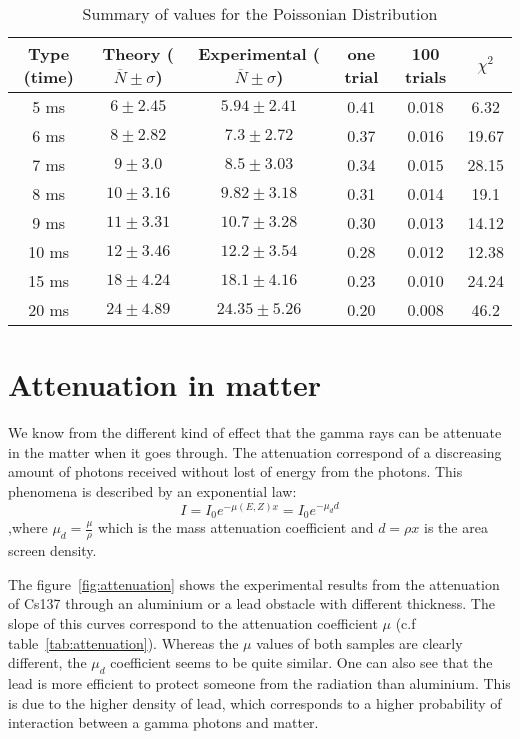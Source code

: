 \documentclass[a4paper,12pt,oneside]{article}
\begin{document}
\begin{table}[h!]
\centering
	\begin{tabular}{|c|c|c|c|c|c|}
	   \hline
	   Type (time) & Theory ($\overline{N}\pm\sigma$)& Experimental ($\overline{N}\pm\sigma$) & one trial & 100 trials & $\chi^2$ \\
		\hline
	   5 ms & $6\pm 2.45$ & $5.94\pm 2.41$ & 0.41 & 0.018 & 6.32\\
	   6 ms & $8\pm 2.82$ & $7.3\pm 2.72$ & 0.37 & 0.016 & 19.67\\
	   7 ms & $9\pm 3.0$ & $8.5\pm 3.03$ & 0.34 & 0.015 & 28.15\\
	   8 ms & $10\pm 3.16$ & $9.82\pm 3.18$ & 0.31 & 0.014 & 19.1\\
	   9 ms & $11\pm 3.31$ & $10.7\pm 3.28$ & 0.30 & 0.013 & 14.12\\
	   10 ms & $12\pm 3.46$ & $12.2\pm 3.54$ & 0.28 & 0.012 & 12.38\\
	   15 ms & $18\pm 4.24$ & $18.1\pm 4.16$ & 0.23 & 0.010 & 24.24\\
	   20 ms & $24\pm 4.89$ & $24.35\pm 5.26$ & 0.20 & 0.008 & 46.2\\
		\hline
	\end{tabular}
	\caption{Summary of values for the Poissonian Distribution}
	\label{tab:poisson}
\end{table}


\newpage
\section{Attenuation in matter}%
We know from the different kind of effect that the gamma rays can be attenuate in the matter when it goes through. The attenuation correspond of a discreasing amount of photons received without lost of energy from the photons.
This phenomena is described by an exponential law:
$$I=I_0e^{-\mu(E,Z)x}=I_0 e^{-\mu_d d}$$
,where $\mu_d=\frac{\mu}{\rho}$ which is the mass attenuation coefficient and $d=\rho x$ is the area screen density.

The figure~\ref{fig:attenuation} shows the experimental results from the attenuation of Cs137 through an aluminium or a lead obstacle with different thickness. The slope of this curves correspond to the attenuation coefficient $\mu$ (c.f table~\ref{tab:attenuation}).
Whereas the $\mu$ values of both samples are clearly different, the $\mu_d$ coefficient seems to be quite similar. One can also see that the lead is more efficient to protect someone from the radiation than aluminium. This is due to the higher density of lead, which corresponds to a higher probability of interaction between a gamma photons and matter.%
\end{document}
